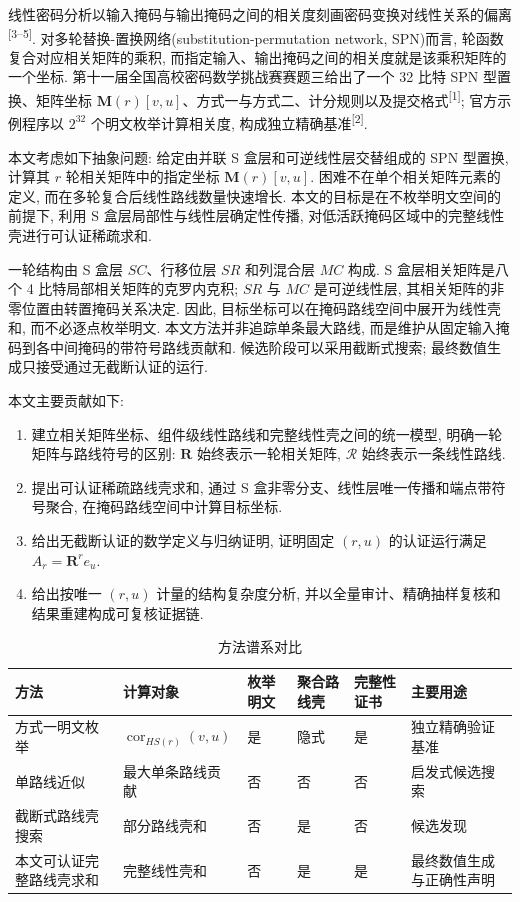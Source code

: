 \documentclass[UTF8,a4paper,zihao=-4,fontset=fandol]{ctexart}
\numberwithin{equation}{section}
\theoremstyle{definition}
\theoremstyle{plain}
\theoremstyle{remark}
\newcommand{\Route}{\mathcal{R}}
\newcommand{\cor}{\operatorname{cor}}
\begin{document}
线性密码分析以输入掩码与输出掩码之间的相关度刻画密码变换对线性关系的偏离\textsuperscript{[3--5]}. 对多轮替换-置换网络(substitution-permutation network, SPN)而言, 轮函数复合对应相关矩阵的乘积, 而指定输入、输出掩码之间的相关度就是该乘积矩阵的一个坐标. 第十一届全国高校密码数学挑战赛赛题三给出了一个 32 比特 SPN 型置换、矩阵坐标 $\bm{M}(r)[v,u]$、方式一与方式二、计分规则以及提交格式\textsuperscript{[1]}; 官方示例程序以 $2^{32}$ 个明文枚举计算相关度, 构成独立精确基准\textsuperscript{[2]}.

本文考虑如下抽象问题: 给定由并联 S 盒层和可逆线性层交替组成的 SPN 型置换, 计算其 $r$ 轮相关矩阵中的指定坐标 $\bm{M}(r)[v,u]$. 困难不在单个相关矩阵元素的定义, 而在多轮复合后线性路线数量快速增长. 本文的目标是在不枚举明文空间的前提下, 利用 S 盒层局部性与线性层确定性传播, 对低活跃掩码区域中的完整线性壳进行可认证稀疏求和.

一轮结构由 S 盒层 $SC$、行移位层 $SR$ 和列混合层 $MC$ 构成. S 盒层相关矩阵是八个 4 比特局部相关矩阵的克罗内克积; $SR$ 与 $MC$ 是可逆线性层, 其相关矩阵的非零位置由转置掩码关系决定. 因此, 目标坐标可以在掩码路线空间中展开为线性壳和, 而不必逐点枚举明文. 本文方法并非追踪单条最大路线, 而是维护从固定输入掩码到各中间掩码的带符号路线贡献和. 候选阶段可以采用截断式搜索; 最终数值生成只接受通过无截断认证的运行.

本文主要贡献如下:
\begin{enumerate}[label=\arabic*.,leftmargin=2.8em,itemsep=0.2em]
  \item 建立相关矩阵坐标、组件级线性路线和完整线性壳之间的统一模型, 明确一轮矩阵与路线符号的区别: $\bm{R}$ 始终表示一轮相关矩阵, $\Route$ 始终表示一条线性路线.
  \item 提出可认证稀疏路线壳求和, 通过 S 盒非零分支、线性层唯一传播和端点带符号聚合, 在掩码路线空间中计算目标坐标.
  \item 给出无截断认证的数学定义与归纳证明, 证明固定 $(r,u)$ 的认证运行满足 $A_r=\bm{R}^r e_u$.
  \item 给出按唯一 $(r,u)$ 计量的结构复杂度分析, 并以全量审计、精确抽样复核和结果重建构成可复核证据链.
\end{enumerate}

\begin{table}[H]
\centering
\caption{方法谱系对比}
\label{tab:method-spectrum}
\begin{tabularx}{\textwidth}{C{2.8cm}L C{1.7cm} C{1.9cm} C{2.1cm} L}
\toprule
方法 & 计算对象 & 枚举明文 & 聚合路线壳 & 完整性证书 & 主要用途 \\
\midrule
方式一明文枚举 & $\cor_{HS(r)}(v,u)$ & 是 & 隐式 & 是 & 独立精确验证基准 \\
单路线近似 & 最大单条路线贡献 & 否 & 否 & 否 & 启发式候选搜索 \\
截断式路线壳搜索 & 部分路线壳和 & 否 & 是 & 否 & 候选发现 \\
本文可认证完整路线壳求和 & 完整线性壳和 & 否 & 是 & 是 & 最终数值生成与正确性声明 \\
\bottomrule
\end{tabularx}
\end{table}
\end{document}
